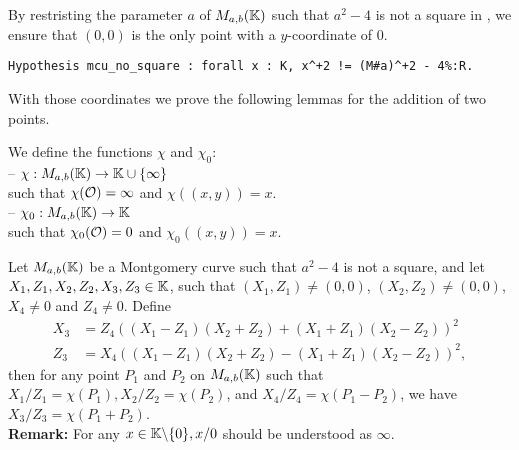 By restristing the parameter $a$ of $M_{a,b}(\mathbb{K})$ such that $a^2-4$ is not a square in \K, we ensure that $(0,0)$ is the only point with a $y$-coordinate of $0$.
\begin{lstlisting}[language=Coq]
Hypothesis mcu_no_square : forall x : K, x^+2 != (M#a)^+2 - 4%:R.
\end{lstlisting}

With those coordinates we prove the following lemmas for the addition of two points.
\begin{definition}We define the functions $\chi$ and $\chi_0$:\\
-- $\chi : M_{a,b}(\mathbb{K}) \to \mathbb{K} \cup \{\infty\}$\\
  such that $\chi(\mathcal{O}) = \infty$ and $\chi((x,y)) = x$.\\
-- $\chi_0 : M_{a,b}(\mathbb{K}) \to \mathbb{K}$\\
  such that $\chi_0(\mathcal{O}) = 0$ and $\chi_0((x,y)) = x$.
\end{definition}
\begin{lemma}
\label{lemma-add}
Let $M_{a,b}(\mathbb{K})$ be a Montgomery curve such that $a^2-4$ is not a square, and let $X_1, Z_1, X_2, Z_2, X_3, Z_3 \in \mathbb{K}$, such that $(X_1,Z_1) \neq (0,0)$, $(X_2,Z_2) \neq (0,0)$, $X_4 \neq 0$ and $Z_4 \neq 0$.
Define
\begin{align*}
X_3 &= Z_4((X_1 - Z_1)(X_2+Z_2) + (X_1+Z_1)(X_2-Z_2))^2\\
Z_3 &= X_4((X_1 - Z_1)(X_2+Z_2) - (X_1+Z_1)(X_2-Z_2))^2,
\end{align*}
then for any point $P_1$ and $P_2$ on $M_{a,b}(\mathbb{K})$ such that $X_1/Z_1 = \chi(P_1), X_2/Z_2 = \chi(P_2)$, and $X_4/Z_4 = \chi(P_1 - P_2)$, we have $X_3/Z_3 = \chi(P_1+P_2)$.\\
\textbf{Remark:} For any $x \in \mathbb{K} \backslash\{0\}, x/0$ should be understood as $\infty$.
\end{lemma}
%
%

